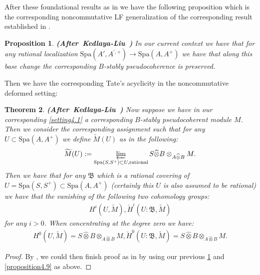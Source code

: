 \documentclass[12pt]{amsart}
\newtheorem{theorem}{Theorem}[section]
\newtheorem{proposition}[theorem]{Proposition}
\theoremstyle{definition}
\numberwithin{equation}{section}
\begin{document}
\indent After these foundational results as in \cite{KL2} we have the following proposition which is the corresponding noncommutative LF generalization of the corresponding result established in \cite[Theorem 2.4.15]{KL2}.


\begin{proposition} \mbox{\bf{(After Kedlaya-Liu \cite[Theorem 2.4.15]{KL2})}} \label{proposition4.10}
In our current context we have that for any rational localization $\mathrm{Spa}(A',A^{',+})\rightarrow \mathrm{Spa}(A,A^+)$ we have that along this base change the corresponding $B$-stably pseudocoherence is preserved.
	
\end{proposition}



\indent Then we have the corresponding Tate's acyclicity in the noncommutative deformed setting:

\begin{theorem}\mbox{\bf{(After Kedlaya-Liu \cite[Theorem 2.5.1]{KL2})}} \label{theorem4.11} Now suppose we have in our corresponding \cref{setting4.1} a corresponding $B$-stably pseudocoherent module $M$. Then we consider the corresponding assignment such that for any $U\subset \mathrm{Spa}(A,A^+)$ we define $\widetilde{M}(U)$ as in the following:
\begin{align}
\widetilde{M}(U):=\varprojlim_{\mathrm{Spa}(S,S^+)\subset U,\mathrm{rational}} S\widehat{\otimes}B\otimes_{A\widehat{\otimes}B}M.	
\end{align}
Then we have that for any $\mathfrak{B}$ which is a rational covering of $U=\mathrm{Spa}(S,S^+)\subset \mathrm{Spa}(A,A^+)$ (certainly this $U$ is also assumed to be rational) we have that the vanishing of the following two cohomology groups:
\begin{align}
H^i(U,\widetilde{M}), \check{H}^i(U:\mathfrak{B},\widetilde{M})
\end{align}
for any $i>0$. When concentrating at the degree zero we have:
\begin{align}
H^0(U,\widetilde{M})=S\widehat{\otimes}B\otimes_{A\widehat{\otimes}B}M, \check{H}^0(U:\mathfrak{B},\widetilde{M})=S\widehat{\otimes}B\otimes_{A\widehat{\otimes}B}M.
\end{align}
	
\end{theorem}
 	

\begin{proof}
By \cite[Propositions 2.4.20-2.4.21]{KL1}, we could then finish proof as in \cite[Theorem 2.5.1]{KL2} by using our previous \cref{proposition4.10} and \cref{proposition4.9} as above.	
\end{proof}
\end{document}
